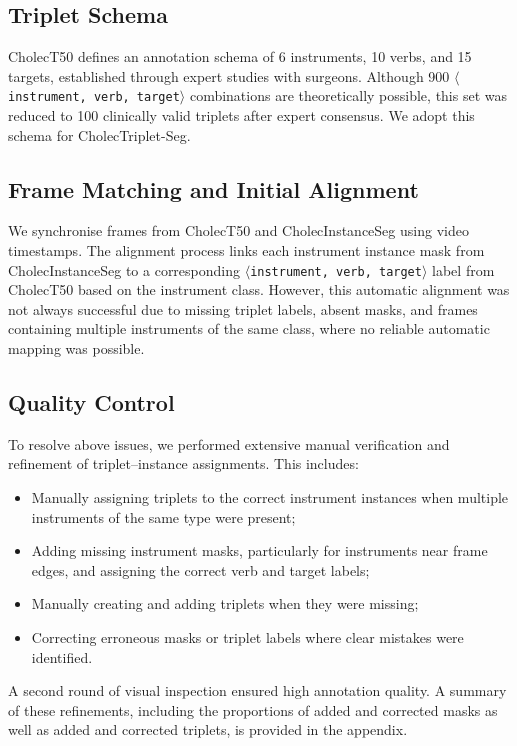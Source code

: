 \documentclass[pdflatex,sn-mathphys-num]{sn-jnl}%
\newcommand{\ivttriplet}{\texttt{$\langle$instrument, verb, target$\rangle$}\xspace}
\theoremstyle{thmstyleone}%
\theoremstyle{thmstyletwo}%
\theoremstyle{thmstylethree}%
\begin{document}
\subsection{Triplet Schema}
CholecT50 \cite{nwoye2022rendezvous} defines an annotation schema of 6 instruments, 10 verbs, and 15 targets, established through expert studies with surgeons. Although 900 \ivttriplet combinations are theoretically possible, this set was reduced to 100 clinically valid triplets after expert consensus. We adopt this schema for CholecTriplet-Seg.


\subsection{Frame Matching and Initial Alignment}  
We synchronise frames from CholecT50 and CholecInstanceSeg using video timestamps. The alignment process links each instrument instance mask from CholecInstanceSeg to a corresponding \ivttriplet label from CholecT50 based on the instrument class. However, this automatic alignment was not always successful due to missing triplet labels, absent masks, and frames containing multiple instruments of the same class, where no reliable automatic mapping was possible.


\subsection{Quality Control}
To resolve above issues, we performed extensive manual verification and refinement of triplet–instance assignments. This includes:
\begin{itemize}
    \item Manually assigning triplets to the correct instrument instances when multiple instruments of the same type were present;
    \item Adding missing instrument masks, particularly for instruments near frame edges, and assigning the correct verb and target labels;
    \item Manually creating and adding triplets when they were missing;
    \item Correcting erroneous masks or triplet labels where clear mistakes were identified.
\end{itemize}

A second round of visual inspection ensured high annotation quality. A summary of these refinements, including the proportions of added and corrected masks as well as added and corrected triplets, is provided in the appendix.
\end{document}
